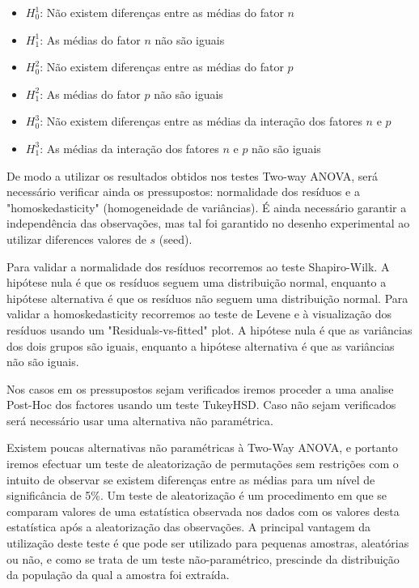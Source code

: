 \documentclass{uofa-eng-assignment}
\begin{document}
\begin{itemize}
\item $H_0^1$: Não existem diferenças entre as médias do fator $n$
\item $H_1^1$: As médias do fator $n$ não são iguais
\end{itemize}
\begin{itemize}
\item $H_0^2$: Não existem diferenças entre as médias do fator $p$
\item $H_1^2$: As médias do fator $p$ não são iguais
\end{itemize}
\begin{itemize}
\item $H_0^3$: Não existem diferenças entre as médias da interação dos fatores $n$ e $p$
\item $H_1^3$: As médias da interação dos fatores $n$ e $p$ não são iguais
\end{itemize}

De modo a utilizar os resultados obtidos nos testes Two-way ANOVA, será necessário verificar ainda os pressupostos: normalidade dos resíduos e a "homoskedasticity" (homogeneidade de variâncias). É ainda necessário garantir a independência das observações, mas tal foi garantido no desenho experimental ao utilizar diferences valores de $s$ (seed).

Para validar a normalidade dos resíduos recorremos ao teste Shapiro-Wilk. A hipótese nula é que os resíduos seguem uma distribuição normal, enquanto a hipótese alternativa é que os resíduos não seguem uma distribuição normal.
Para validar a homoskedasticity recorremos ao teste de Levene e à visualização dos resíduos usando um "Residuals-vs-fitted" plot. A hipótese nula é que as variâncias dos dois grupos são iguais, enquanto a hipótese alternativa é que as variâncias não são iguais.

Nos casos em os pressupostos sejam verificados iremos proceder a uma analise Post-Hoc dos factores usando um teste TukeyHSD. Caso não sejam verificados será necessário usar uma alternativa não paramétrica.

Existem poucas alternativas não paramétricas à Two-Way ANOVA, e portanto iremos efectuar um teste de aleatorização de permutações sem restrições com o intuito de observar se existem diferenças entre as médias para um nível de significância de 5\%. Um teste de aleatorização é um procedimento em que se comparam valores de uma estatística observada nos dados com os valores desta estatística após a aleatorização das observações. A principal vantagem da utilização deste teste é que pode ser utilizado para pequenas amostras, aleatórias ou não, e como se trata de um teste não-paramétrico, prescinde da distribuição da população da qual a amostra foi extraída.
\end{document}
